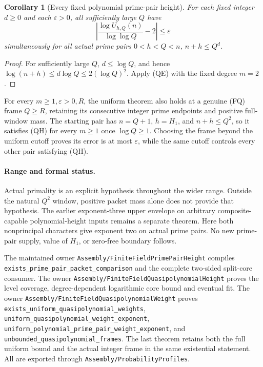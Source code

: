 \documentclass[11pt]{article}
\newtheorem{corollary}[theorem]{Corollary}
\begin{document}
\begin{corollary}[Every fixed polynomial prime-pair height]
\label{cor:polynomial-prime-pair-weight}
For each fixed integer \(d\geq0\) and each \(\varepsilon>0\),
all sufficiently large \(Q\) have
\[
 \left|\frac{\log U_{h,Q}(n)}{\log\log Q}-2\right|
       \leq\varepsilon
\]
simultaneously for all actual prime pairs
\(0<h<Q<n\), \(n+h\leq Q^d\).
\end{corollary}
\begin{proof}
For sufficiently large \(Q\), \(d\leq\log Q\), and hence
\(\log(n+h)\leq d\log Q\leq2(\log Q)^2\).
Apply (QE) with the fixed degree \(m=2\).
\end{proof}

For every \(m\geq1,\varepsilon>0,R\), the uniform theorem also
holds at a genuine (FQ) frame \(Q\geq R\), retaining its
consecutive integer prime endpoints and positive full-window mass.
The starting pair has \(n=Q+1\), \(h=H_1\), and
\(n+h\leq Q^2\), so it satisfies (QH) for every \(m\geq1\)
once \(\log Q\geq1\). Choosing the frame beyond the uniform
cutoff proves its error is at most \(\varepsilon\), while the
same cutoff controls every other pair satisfying (QH).

\paragraph{Range and formal status.}
Actual primality is an explicit hypothesis throughout the wider
range. Outside the natural \(Q^2\) window, positive packet mass
alone does not provide that hypothesis. The earlier exponent-three
upper envelope on arbitrary composite-capable polynomial-height
inputs remains a separate theorem. Here both nonprincipal
characters give exponent two on actual prime pairs. No new
prime-pair supply, value of \(H_1\), or zero-free boundary follows.

The maintained owner \texttt{Assembly/FiniteFieldPrimePairHeight}
compiles \texttt{exists\_prime\_pair\_packet\_comparison} and the
complete two-sided split-core consumer.
The owner \texttt{Assembly/FiniteFieldQuasipolynomialHeight}
proves the level coverage, degree-dependent logarithmic core bound
and eventual fit.
The owner \texttt{Assembly/FiniteFieldQuasipolynomialWeight}
proves \texttt{exists\_uniform\_quasipolynomial\_weights},
\texttt{uniform\_quasipolynomial\_weight\_exponent},
\texttt{uniform\_polynomial\_prime\_pair\_weight\_exponent}, and
\texttt{unbounded\_quasipolynomial\_frames}. The last theorem
retains both the full uniform bound and the actual integer frame
in the same existential statement. All are exported through
\texttt{Assembly/ProbabilityProfiles}.
\end{document}
